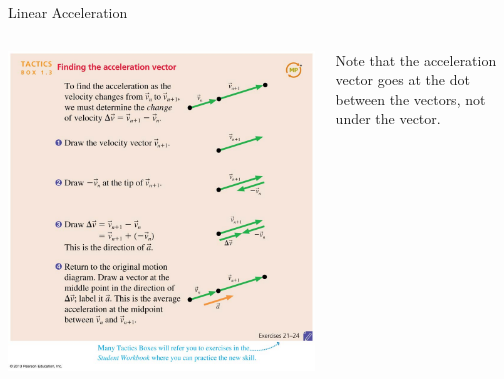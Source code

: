 \documentclass{beamer}
\begin{document}
\begin{frame}{Linear Acceleration}
\begin{columns}
\begin{column}{0.70\textwidth}
   \begin{center}
      \includegraphics[height=0.9\textheight]{../figures/tactics1_3.jpg}
   \end{center}
\end{column}
\begin{column}{0.3\textwidth}
   Note that the acceleration vector goes at the dot between the vectors, not under the vector.
\end{column}
\end{columns}
\end{frame}
\end{document}
